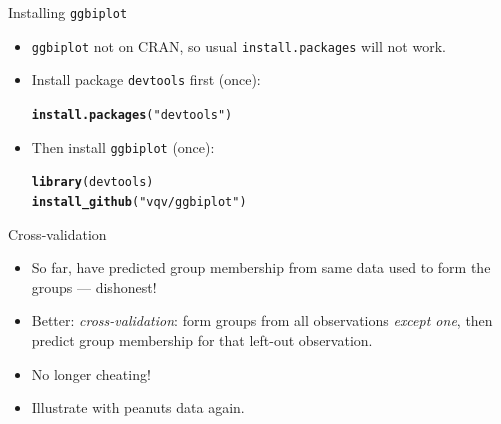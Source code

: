 \documentclass[unknownkeysallowed]{beamer}\usepackage[]{graphicx}\usepackage[]{color}
\makeatletter
\newcommand{\hlstr}[1]{\textcolor[rgb]{0.192,0.494,0.8}{#1}}%
\newcommand{\hlstd}[1]{\textcolor[rgb]{0.345,0.345,0.345}{#1}}%
\newcommand{\hlkwd}[1]{\textcolor[rgb]{0.737,0.353,0.396}{\textbf{#1}}}%
\newenvironment{kframe}{%
 \def\at@end@of@kframe{}%
 \ifinner\ifhmode%
  \def\at@end@of@kframe{\end{minipage}}%
  \begin{minipage}{\columnwidth}%
 \fi\fi%
 \def\FrameCommand##1{\hskip\@totalleftmargin \hskip-\fboxsep
 \colorbox{shadecolor}{##1}\hskip-\fboxsep
     \hskip-\linewidth \hskip-\@totalleftmargin \hskip\columnwidth}%
 \MakeFramed {\advance\hsize-\width
   \@totalleftmargin\z@ \linewidth\hsize
   \@setminipage}}%
 {\par\unskip\endMakeFramed%
 \at@end@of@kframe}
\newenvironment{knitrout}{}{} %
\makeatother
\begin{document}
\begin{frame}[fragile]{Installing \texttt{ggbiplot}}
  
  \begin{itemize}
  \item \texttt{ggbiplot} not on CRAN, so usual
    \texttt{install.packages} will not work.
  \item Install package \texttt{devtools} first (once):
    
\begin{knitrout}
\color{fgcolor}\begin{kframe}
\begin{alltt}
\hlkwd{install.packages}\hlstd{(}\hlstr{"devtools"}\hlstd{)}
\end{alltt}
\end{kframe}
\end{knitrout}
  \item Then install \texttt{ggbiplot} (once):
\begin{knitrout}
\color{fgcolor}\begin{kframe}
\begin{alltt}
\hlkwd{library}\hlstd{(devtools)}
\hlkwd{install_github}\hlstd{(}\hlstr{"vqv/ggbiplot"}\hlstd{)}
\end{alltt}
\end{kframe}
\end{knitrout}
  \end{itemize}
  
\end{frame}


\begin{frame}[fragile]{Cross-validation}
  
  \begin{itemize}
  \item So far, have predicted group membership from same data used to
    form the groups --- dishonest!
  \item Better: \emph{cross-validation}: form groups from all
    observations \emph{except one}, then predict group membership for
    that left-out observation.
  \item No longer cheating!
  \item Illustrate with peanuts data again.
  \end{itemize}
  
\end{frame}
\end{document}
